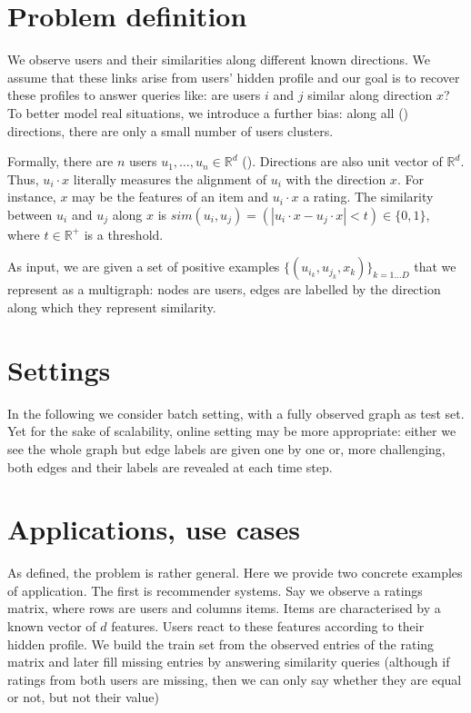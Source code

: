 \section{Problem definition}

We observe users and their similarities along different known directions. We
assume that these links arise from users' hidden profile and our goal is to
recover these profiles to answer queries like: are users $i$ and $j$ similar
along direction $x$? To better model real situations, we introduce a further
bias: along all () directions, there are only a small number
of users clusters.

Formally, there are $n$ users $u_1, \ldots, u_n \in \mathbb{R}^d$ (). Directions are also unit vector of
$\mathbb{R}^d$. Thus, $u_i\cdot x$ literally measures the alignment of $u_i$
with the direction $x$. For instance, $x$ may be the features of an item and
$u_i\cdot x$ a rating. The similarity between $u_i$ and $u_j$ along $x$ is
$sim(u_i, u_j) = \left( |u_i\cdot x - u_j\cdot x| < t \right) \in \{0, 1\}$,
where $t \in \mathbb{R}^+$ is a threshold.

As input, we are given a set of positive examples $\{(u_{i_k}, u_{j_k},
x_k)\}_{k=1\ldots D}$ that we represent as a multigraph: nodes are users, edges
are labelled by the direction along which they represent similarity.


\section{Settings}

In the following we consider batch setting, with a fully observed graph as test
set. Yet for the sake of scalability, online setting may be more appropriate:
either we see the whole graph but edge labels are given one by one or, more
challenging, both edges and their labels are revealed at each time step.

\section{Applications, use cases}

As defined, the problem is rather general. Here we provide two concrete
examples of application. The first is recommender systems. Say we observe a
ratings matrix, where rows are users and columns items. Items are characterised
by a known vector of $d$ features. Users react to these features according to
their hidden profile. We build the train set from the observed entries of the
rating matrix and later fill missing entries by answering similarity queries
(although if ratings from both users are missing, then we can only say whether
they are equal or not, but not their value)


